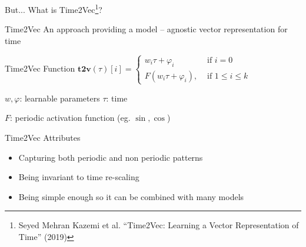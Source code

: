 \documentclass[compress, mathserif, fleqn, 10pt]{beamer}
\begin{document}
	\begin{frame}{But... What is Time2Vec\footnote[1]{Seyed Mehran Kazemi et al. “Time2Vec:
				Learning a Vector Representation of Time” (2019)}?}
		\begin{block}{Time2Vec}
			An approach providing a model – agnostic vector representation for time
		\end{block}
		
		\begin{block}{Time2Vec Function}
			\centering
			{ $\textbf{t2v}(\tau)[i]=\left\{\begin{array}{cc}w_i \tau+\varphi_i & \text{ if } i=0 \\ F \left(w_i \tau+\varphi_i\right), & \text{ if } 1 \leq i \leq k\end{array}\right.$ }
			
			\smallskip
			
			$w, \varphi$: learnable parameters \space $\tau$: time
			
			$F$: periodic activation function (eg. $\sin, \cos$)
		\end{block}
		
		\begin{block}{Time2Vec Attributes}
			\begin{itemize}
				\item Capturing both periodic and non periodic patterns
				
				\item Being invariant to time re-scaling
				
				\item Being simple enough so it can be combined with many models
			\end{itemize}
		\end{block}
	\end{frame}
	
\end{document}
